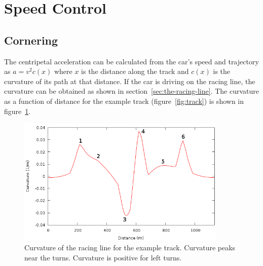\documentclass{article}
\begin{document}
\section{Speed Control}
\subsection{Cornering}
The centripetal acceleration can be calculated from the car's speed and
trajectory as $a = v^2 c(x)$ where $x$ is the distance along the track and
$c(x)$ is the curvature of its path at that distance.  If the car is driving on
the racing line, the curvature can be obtained as shown in
section~\ref{sec:the-racing-line}.  The curvature as a function of distance for
the example track (figure~\ref{fig:track}) is shown in
figure~\ref{fig:curvature}.

\begin{figure}
  \centering
  \includegraphics[width=10cm]{curvature.png}  
  \caption{Curvature of the racing line for the example track.  Curvature peaks
    near the turns.  Curvature is positive for left turns.}
  \label{fig:curvature}
\end{figure}
\end{document}
